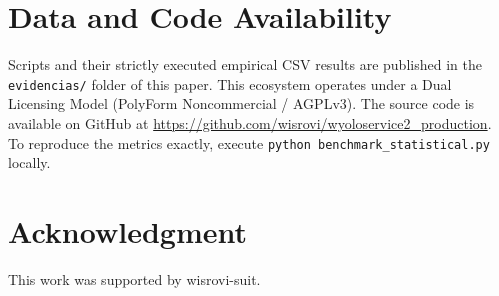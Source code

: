 \documentclass[conference]{IEEEtran}
\begin{document}
\section*{Data and Code Availability}
Scripts and their strictly executed empirical CSV results are published in the \texttt{evidencias/} folder of this paper. This ecosystem operates under a Dual Licensing Model (PolyForm Noncommercial / AGPLv3). The source code is available on GitHub at \url{https://github.com/wisrovi/wyoloservice2_production}. To reproduce the metrics exactly, execute \texttt{python benchmark\_statistical.py} locally.

\section*{Acknowledgment}
This work was supported by wisrovi-suit.



\end{document}
